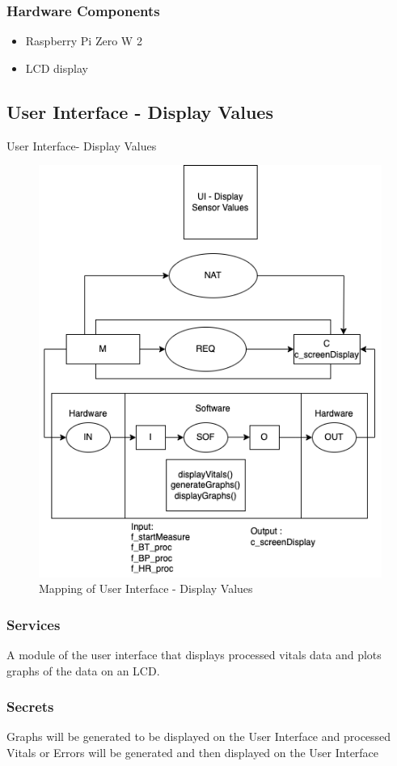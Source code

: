 \documentclass{article}
\newcounter{mnum}
\newcommand{\mthemnum}{M\themnum}
\begin{document}
\begin{description}
        \subsubsection{Hardware Components}
         \begin{itemize}
            \item Raspberry Pi Zero W 2
            \item LCD display
            \end{itemize}
    \newpage
    
    \subsection{User Interface - Display Values}
    \item [\refstepcounter{mnum} \mthemnum \label{UI_DV}:] User Interface- Display Values
    \begin{figure}[!htb]
    	\centering
    	\includegraphics[width=0.5\linewidth]{DisplaySensorValues.png}
    	\caption{Mapping of User Interface - Display Values}
    \end{figure}
        \subsubsection{Services}
        A module of the user interface that displays processed vitals data and plots graphs of the data on an LCD.
        \subsubsection{Secrets}
        Graphs will be generated to be displayed on the User Interface and processed Vitals or Errors will be generated and then displayed on the User Interface
        \newpage

\end{description}
\end{document}
